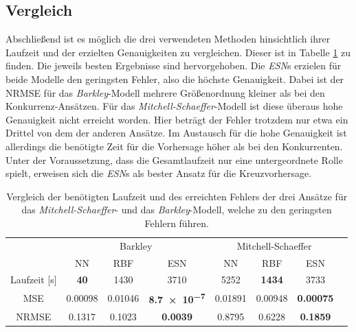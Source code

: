 \FloatBarrier
\subsection{Vergleich}
Abschließend ist es möglich die drei verwendeten Methoden hinsichtlich ihrer Laufzeit und der erzielten Genauigkeiten zu vergleichen. Dieser ist in Tabelle \ref{tab:exp_cross_comparison_results} zu finden. Die jeweils  besten Ergebnisse sind hervorgehoben. Die \textit{ESN}s erzielen für beide Modelle den geringsten Fehler, also die höchste Genauigkeit. Dabei ist der NRMSE für das \textit{Barkley}-Modell mehrere Größenordnung kleiner als bei den Konkurrenz-Ansätzen. Für das \textit{Mitchell-Schaeffer}-Modell ist diese überaus hohe Genauigkeit nicht erreicht worden. Hier beträgt der Fehler trotzdem nur etwa ein Drittel von dem der anderen Ansätze. Im Austausch für die hohe Genauigkeit ist allerdings die benötigte Zeit für die Vorhersage höher als bei den Konkurrenten. Unter der Voraussetzung, dass die Gesamtlaufzeit nur eine untergeordnete Rolle spielt, erweisen sich die \textit{ESN}s als bester Ansatz für die Kreuzvorhersage.
\begin{table}[h]
	\centering
	\captionsetup{width=0.9\linewidth}
	\begin{tabular}{cccccccc}
		\hline		
		\multicolumn{1}{c}{} & \multicolumn{3}{c}{Barkley} & \multicolumn{3}{c}{Mitchell-Schaeffer}		\\
		\multicolumn{1}{c}{} & NN & RBF & ESN & NN & RBF & ESN \\
		
		\hline
		
		Laufzeit [s] 	& \textbf{40} 		& 1430		& 3710		& 5252		& \textbf{1434} 		& 3733 \\
		MSE 			& 0.00098	& 0.01046	& \textbf{\num{8.7e-7}} 	& 0.01891	& 0.00948 	& \textbf{0.00075} \\
		NRMSE 			& 0.1317	& 0.1023	& \textbf{\num{0.0039}} 	& 0.8795	& 0.6228 	& \textbf{0.1859} \\
		\hline 
	\end{tabular} 
	\caption{Vergleich der benötigten Laufzeit und des erreichten Fehlers der drei Ansätze für das \textit{Mitchell-Schaeffer}- und das \textit{Barkley}-Modell, welche zu den geringsten Fehlern führen.}
	\label{tab:exp_cross_comparison_results}
\end{table}

\FloatBarrier